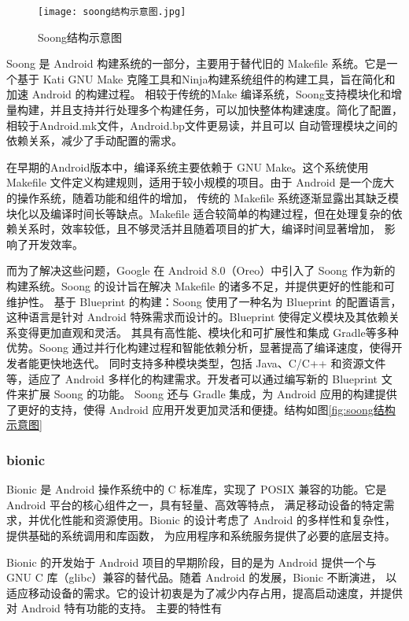 \begin{figure}[h]
  \centering
  \texttt{[image: soong结构示意图.jpg]}
  \caption{Soong结构示意图}
  \label{fig:Soong结构示意图}
\end{figure}

Soong 是 Android 构建系统的一部分，主要用于替代旧的 Makefile 系统。它是一个基于 Kati GNU Make 克隆工具和Ninja构建系统组件的构建工具，旨在简化和加速 Android 的构建过程。
相较于传统的Make 编译系统，Soong支持模块化和增量构建，并且支持并行处理多个构建任务，可以加快整体构建速度。简化了配置，相较于Android.mk文件，Android.bp文件更易读，并且可以
自动管理模块之间的依赖关系，减少了手动配置的需求。

在早期的Android版本中，编译系统主要依赖于 GNU Make。这个系统使用 Makefile 文件定义构建规则，适用于较小规模的项目。由于 Android 是一个庞大的操作系统，随着功能和组件的增加，
传统的 Makefile 系统逐渐显露出其缺乏模块化以及编译时间长等缺点。Makefile 适合较简单的构建过程，但在处理复杂的依赖关系时，效率较低，且不够灵活并且随着项目的扩大，编译时间显著增加，
影响了开发效率。

而为了解决这些问题，Google 在 Android 8.0（Oreo）中引入了 Soong 作为新的构建系统。Soong 的设计旨在解决 Makefile 的诸多不足，并提供更好的性能和可维护性。
基于 Blueprint 的构建：Soong 使用了一种名为 Blueprint 的配置语言，这种语言是针对 Android 特殊需求而设计的。Blueprint 使得定义模块及其依赖关系变得更加直观和灵活。
其具有高性能、模块化和可扩展性和集成 Gradle等多种优势。Soong 通过并行化构建过程和智能依赖分析，显著提高了编译速度，使得开发者能更快地迭代。
同时支持多种模块类型，包括 Java、C/C++ 和资源文件等，适应了 Android 多样化的构建需求。开发者可以通过编写新的 Blueprint 文件来扩展 Soong 的功能。
Soong 还与 Gradle 集成，为 Android 应用的构建提供了更好的支持，使得 Android 应用开发更加灵活和便捷。结构如图\ref{fig:soong结构示意图}

\subsubsection{bionic}

Bionic 是 Android 操作系统中的 C 标准库，实现了 POSIX 兼容的功能。它是 Android 平台的核心组件之一，具有轻量、高效等特点，
满足移动设备的特定需求，并优化性能和资源使用。Bionic 的设计考虑了 Android 的多样性和复杂性，提供基础的系统调用和库函数，
为应用程序和系统服务提供了必要的底层支持。

Bionic 的开发始于 Android 项目的早期阶段，目的是为 Android 提供一个与 GNU C 库（glibc）兼容的替代品。随着 Android 的发展，Bionic 不断演进，
以适应移动设备的需求。它的设计初衷是为了减少内存占用，提高启动速度，并提供对 Android 特有功能的支持。
主要的特性有

